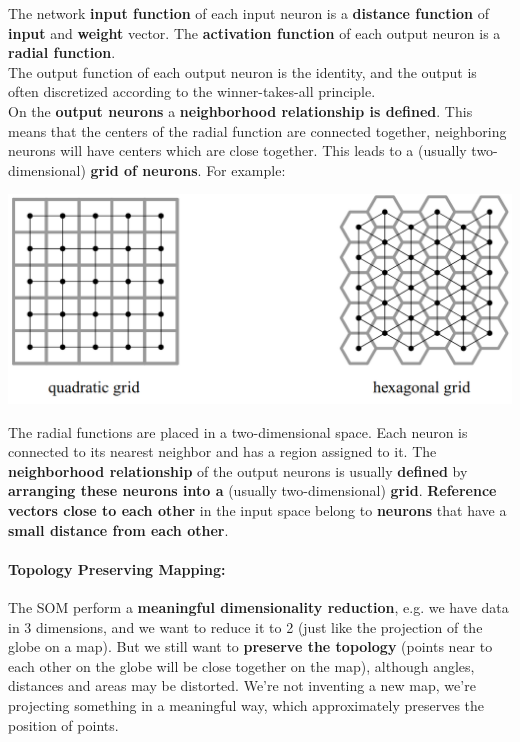The network \textbf{input function} of each input neuron is a \textbf{distance function} of \textbf{input} and \textbf{weight} vector. The \textbf{activation function} of each output neuron is a \textbf{radial function}. \\

The output function of each output neuron is the identity, and the output is often discretized according to the winner-takes-all principle. \\

On the \textbf{output neurons} a \textbf{neighborhood relationship is defined}. This means that the centers of the radial function are connected together, neighboring neurons will have centers which are close together. This leads to a (usually two-dimensional) \textbf{grid of neurons}. For example:
\begin{center}
	\includegraphics[width=0.85\columnwidth]{img/NN/SOM1}
\end{center}

The radial functions are placed in a two-dimensional space. Each neuron is connected to its nearest neighbor and has a region assigned to it. The \textbf{neighborhood relationship} of the output neurons is usually \textbf{defined} by \textbf{arranging these neurons into a} (usually two-dimensional) \textbf{grid}. \textbf{Reference vectors close to each other} in the input space belong to \textbf{neurons} that have a \textbf{small distance from each other}.\\

\newpage

\paragraph{Topology Preserving Mapping:} The SOM perform a \textbf{meaningful dimensionality reduction}, e.g. we have data in 3 dimensions, and we want to reduce it to 2 (just like the projection of the globe on a map). But we still want to \textbf{preserve the topology} (points near to each other on the globe will be close together on the map), although angles, distances and areas may be distorted. We're not inventing a new map, we're projecting something in a meaningful way, which approximately preserves the position of points.

